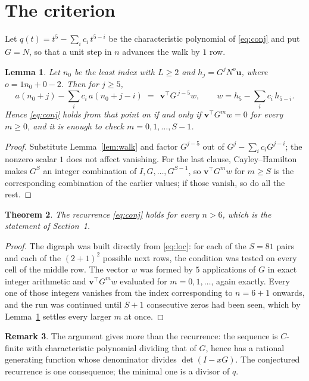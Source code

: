 \documentclass[11pt,a4paper]{article}
\theoremstyle{plain}
\newtheorem{theorem}{Theorem}
\newtheorem{lemma}[theorem]{Lemma}
\theoremstyle{definition}
\newtheorem{remark}[theorem]{Remark}
\begin{document}
\section{The criterion}

Let $q(t)=t^{5}-\sum_i c_i\,t^{5-i}$ be the characteristic polynomial of
\eqref{eq:conj} and put $G=N$, so that a unit step in $n$ advances the walk by
$1$ row.

\begin{lemma}\label{lem:crit}
Let $n_0$ be the least index with $L\ge2$ and $h_j=G^{j}N^{o}\mathbf{u}$, where
$o=1n_0+0-2$. Then for $j\ge5$,
\[
a(n_0+j)-\sum_i c_i\,a(n_0+j-i)\;=\;\,\mathbf{v}^{\!\top}G^{\,j-5}w,
\qquad w=h_{5}-\sum_i c_i\,h_{5-i} .
\]
Hence \eqref{eq:conj} holds from that point on if and only if
$\mathbf{v}^{\!\top}G^{m}w=0$ for every $m\ge0$, and it is enough to check
$m=0,1,\dots,S-1$.
\end{lemma}

\begin{proof}
Substitute Lemma~\ref{lem:walk} and factor $G^{j-5}$ out of
$G^{j}-\sum_ic_iG^{j-i}$; the nonzero scalar $1$ does not affect
vanishing. For the last clause, Cayley--Hamilton makes $G^{S}$ an integer combination of
$I,G,\dots,G^{S-1}$, so $\mathbf{v}^{\!\top}G^{m}w$ for $m\ge S$ is the corresponding
combination of the earlier values; if those vanish, so do all the rest.
\end{proof}

\begin{theorem}
The recurrence \eqref{eq:conj} holds for every $n>6$, which is the statement of
Section~1.
\end{theorem}

\begin{proof}
The digraph was built directly from \eqref{eq:loc}: for each of the $S=81$ pairs and each
of the $(2+1)^{2}$ possible next rows, the condition was tested on every cell of
the middle row. The vector $w$ was formed by $5$ applications of $G$ in exact integer
arithmetic and $\mathbf{v}^{\!\top}G^{m}w$ evaluated for $m=0,1,\dots$, again exactly.
Every one of those integers vanishes from the index corresponding to $n=6+1$ onwards,
and the run was continued until $S+1$ consecutive zeros had been seen, which by
Lemma~\ref{lem:crit} settles every larger $m$ at once.
\end{proof}

\begin{remark}
The argument gives more than the recurrence: the sequence is $C$-finite with characteristic
polynomial dividing that of $G$, hence has a rational generating function whose denominator
divides $\det(I-xG)$. The conjectured recurrence is one consequence; the minimal one is a
divisor of $q$.
\end{remark}
\end{document}
